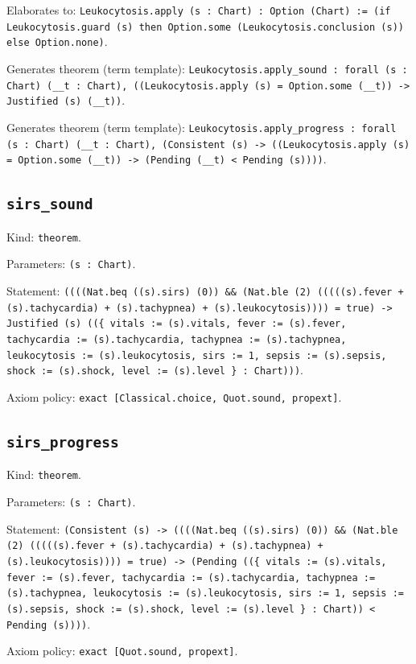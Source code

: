 \documentclass[11pt]{article}
\begin{document}
\noindent Elaborates to: \texttt{Leukocytosis.apply (s : Chart) : Option (Chart) := (if Leukocytosis.guard (s) then Option.some (Leukocytosis.conclusion (s)) else Option.none)}.\par
\noindent Generates theorem (term template): \texttt{Leukocytosis.apply\_sound : forall (s : Chart) (\_\_t : Chart), ((Leukocytosis.apply (s) = Option.some (\_\_t)) -> Justified (s) (\_\_t))}.\par
\noindent Generates theorem (term template): \texttt{Leukocytosis.apply\_progress : forall (s : Chart) (\_\_t : Chart), (Consistent (s) -> ((Leukocytosis.apply (s) = Option.some (\_\_t)) -> (Pending (\_\_t) < Pending (s))))}.\par
\subsection*{\texttt{sirs\_sound}}
\noindent Kind: \texttt{theorem}.\par
\noindent Parameters: \texttt{(s : Chart)}.\par
\noindent Statement: \texttt{((((Nat.beq ((s).sirs) (0)) \&\& (Nat.ble (2) (((((s).fever + (s).tachycardia) + (s).tachypnea) + (s).leukocytosis)))) = true) -> Justified (s) ((\{ vitals := (s).vitals, fever := (s).fever, tachycardia := (s).tachycardia, tachypnea := (s).tachypnea, leukocytosis := (s).leukocytosis, sirs := 1, sepsis := (s).sepsis, shock := (s).shock, level := (s).level \} : Chart)))}.\par
\noindent Axiom policy: \texttt{exact [Classical.choice, Quot.sound, propext]}.\par
\subsection*{\texttt{sirs\_progress}}
\noindent Kind: \texttt{theorem}.\par
\noindent Parameters: \texttt{(s : Chart)}.\par
\noindent Statement: \texttt{(Consistent (s) -> ((((Nat.beq ((s).sirs) (0)) \&\& (Nat.ble (2) (((((s).fever + (s).tachycardia) + (s).tachypnea) + (s).leukocytosis)))) = true) -> (Pending ((\{ vitals := (s).vitals, fever := (s).fever, tachycardia := (s).tachycardia, tachypnea := (s).tachypnea, leukocytosis := (s).leukocytosis, sirs := 1, sepsis := (s).sepsis, shock := (s).shock, level := (s).level \} : Chart)) < Pending (s))))}.\par
\noindent Axiom policy: \texttt{exact [Quot.sound, propext]}.\par
\end{document}
